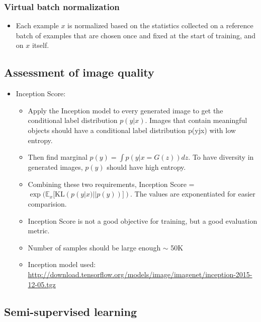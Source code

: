 \documentclass{article}
\begin{document}
    \subsubsection{Virtual batch normalization}\label{subsubsec:Improved_Techniques_for_Training_GANs:virtual-batch-normalization}
    \begin{itemize}
        \item Each example $x$ is normalized based on the statistics collected on a reference batch of examples that are chosen once and fixed at the start of training, and on $x$ itself.
    \end{itemize}

    \subsection{Assessment of image quality}\label{subsec:Improved_Techniques_for_Training_GANs:assessment-of-image-quality}
    \begin{itemize}
        \item Inception Score:
        \begin{itemize}
            \item Apply the Inception model to every generated image to get the conditional label distribution $p(y|x)$.
            Images that contain meaningful objects should have a conditional label distribution p(yjx) with low entropy.
            \item Then find marginal $p(y) = \int p(y|x=G(z))dz$.
            To have diversity in generated images, $p(y)$ should have high entropy.
            \item Combining these two requirements, Inception Score = $\exp(\mathbb{E}_{x}[\textrm{KL}(p(y|x)||p(y))])$.
            The values are exponentiated for easier comparision.
            \item Inception Score is not a good objective for training, but a good evaluation metric.
            \item Number of samples should be large enough $\sim$ 50K
            \item Inception model used: \url{http://download.tensorflow.org/models/image/imagenet/inception-2015-12-05.tgz}
        \end{itemize}
    \end{itemize}

    \subsection{Semi-supervised learning}\label{subsec:Improved_Techniques_for_Training_GANs:semi-supervised-learning}
\end{document}
